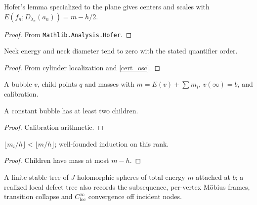 \begin{lemma}
\label{b02_calibrated}
\leanok
{}
Hofer's lemma specialized to the plane gives centers and scales with
$E(f_n;D_{\lambda_n}(a_n))=m-h/2$.
\end{lemma}
\begin{proof}\leanok From \texttt{Mathlib.Analysis.Hofer}.\end{proof}

\begin{theorem}
\label{b03_neck}
\leanok
{}
Neck energy and neck diameter tend to zero with the stated quantifier order.
\end{theorem}
\begin{proof}\leanok From cylinder localization and \cref{cert_osc}.\end{proof}

\begin{definition}
\label{def_onelevel}
\leanok
{}
A bubble $v$, child points $q$ and masses with $m=E(v)+\sum m_i$, $v(\infty)=b$, and calibration.
\end{definition}

\begin{lemma}
\label{b05_ghost}
\leanok
{}
A constant bubble has at least two children.
\end{lemma}
\begin{proof}\leanok Calibration arithmetic.\end{proof}

\begin{lemma}
\label{b06_rank}
\leanok
{}
$\lfloor m_i/h\rfloor<\lfloor m/h\rfloor$; well-founded induction on this rank.
\end{lemma}
\begin{proof}\leanok Children have mass at most $m-h$.\end{proof}

\begin{definition}
\label{def_local_tree}
\leanok
{}
A finite stable tree of $J$-holomorphic spheres of total energy $m$ attached at $b$; a realized local
defect tree also records the subsequence, per-vertex M\"obius frames, transition collapse and
$C^\infty_{\mathrm{loc}}$ convergence off incident nodes.
\end{definition}

